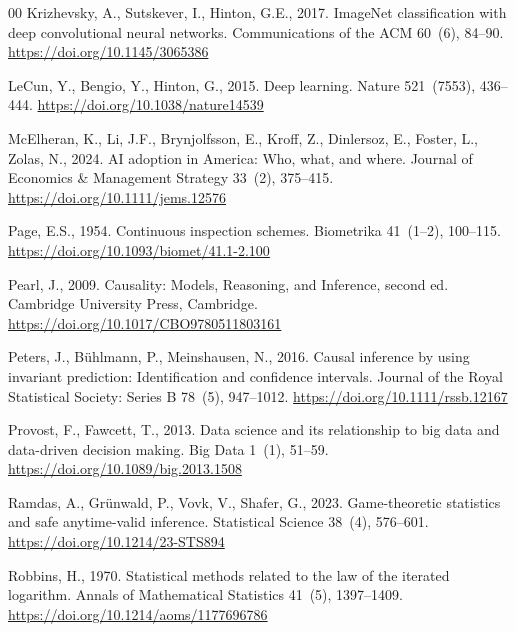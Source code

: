 \documentclass[review,authoryear,12pt]{elsarticle}
\begin{document}
\begin{thebibliography}{00}
Krizhevsky, A., Sutskever, I., Hinton, G.E., 2017. ImageNet classification with deep convolutional neural networks. Communications of the ACM 60~(6), 84--90. \url{https://doi.org/10.1145/3065386}

LeCun, Y., Bengio, Y., Hinton, G., 2015. Deep learning. Nature 521~(7553), 436--444. \url{https://doi.org/10.1038/nature14539}

McElheran, K., Li, J.F., Brynjolfsson, E., Kroff, Z., Dinlersoz, E., Foster, L., Zolas, N., 2024. AI adoption in America: Who, what, and where. Journal of Economics \& Management Strategy 33~(2), 375--415. \url{https://doi.org/10.1111/jems.12576}

Page, E.S., 1954. Continuous inspection schemes. Biometrika 41~(1--2), 100--115. \url{https://doi.org/10.1093/biomet/41.1-2.100}

Pearl, J., 2009. Causality: Models, Reasoning, and Inference, second ed. Cambridge University Press, Cambridge. \url{https://doi.org/10.1017/CBO9780511803161}

Peters, J., B\"uhlmann, P., Meinshausen, N., 2016. Causal inference by using invariant prediction: Identification and confidence intervals. Journal of the Royal Statistical Society: Series B 78~(5), 947--1012. \url{https://doi.org/10.1111/rssb.12167}

Provost, F., Fawcett, T., 2013. Data science and its relationship to big data and data-driven decision making. Big Data 1~(1), 51--59. \url{https://doi.org/10.1089/big.2013.1508}

Ramdas, A., Gr\"unwald, P., Vovk, V., Shafer, G., 2023. Game-theoretic statistics and safe anytime-valid inference. Statistical Science 38~(4), 576--601. \url{https://doi.org/10.1214/23-STS894}

Robbins, H., 1970. Statistical methods related to the law of the iterated logarithm. Annals of Mathematical Statistics 41~(5), 1397--1409. \url{https://doi.org/10.1214/aoms/1177696786}


\end{thebibliography}
\end{document}
